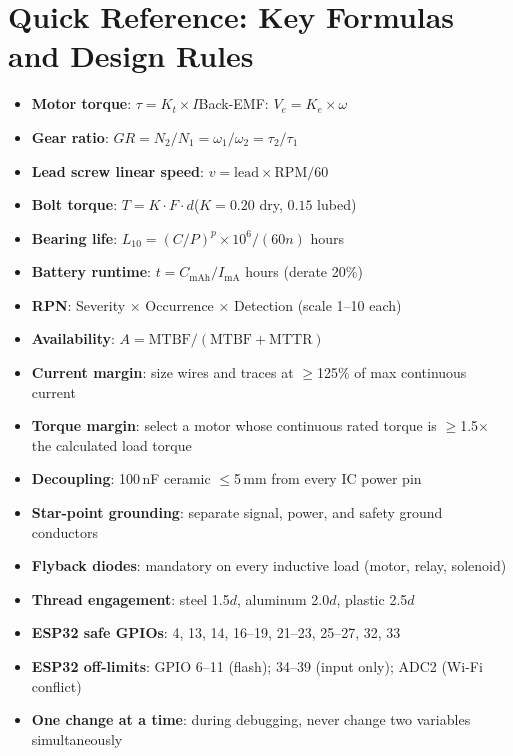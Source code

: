 \section{Quick Reference: Key Formulas and Design Rules}

\begin{checklistbox}
\begin{itemize}[leftmargin=*, itemsep=2pt, topsep=0pt]
    \item \textbf{Motor torque}: $\tau = K_t \times I$\quad Back-EMF: $V_e = K_e \times \omega$
    \item \textbf{Gear ratio}: $GR = N_2/N_1 = \omega_1/\omega_2 = \tau_2/\tau_1$
    \item \textbf{Lead screw linear speed}: $v = \text{lead} \times \text{RPM} / 60$
    \item \textbf{Bolt torque}: $T = K \cdot F \cdot d$\quad ($K=0.20$ dry, $0.15$ lubed)
    \item \textbf{Bearing life}: $L_{10} = (C/P)^p \times 10^6 / (60n)$ hours
    \item \textbf{Battery runtime}: $t = C_{\text{mAh}} / I_{\text{mA}}$ hours (derate 20\%)
    \item \textbf{RPN}: Severity $\times$ Occurrence $\times$ Detection (scale 1--10 each)
    \item \textbf{Availability}: $A = \text{MTBF} / (\text{MTBF} + \text{MTTR})$
\end{itemize}
\end{checklistbox}

\begin{checklistbox}
\begin{itemize}[leftmargin=*, itemsep=2pt, topsep=0pt]
    \item \textbf{Current margin}: size wires and traces at $\geq$125\% of max continuous current
    \item \textbf{Torque margin}: select a motor whose continuous rated torque is $\geq$1.5$\times$ the calculated load torque
    \item \textbf{Decoupling}: 100\,nF ceramic $\leq$5\,mm from every IC power pin
    \item \textbf{Star-point grounding}: separate signal, power, and safety ground conductors
    \item \textbf{Flyback diodes}: mandatory on every inductive load (motor, relay, solenoid)
    \item \textbf{Thread engagement}: steel 1.5$d$, aluminum 2.0$d$, plastic 2.5$d$
    \item \textbf{ESP32 safe GPIOs}: 4, 13, 14, 16--19, 21--23, 25--27, 32, 33
    \item \textbf{ESP32 off-limits}: GPIO 6--11 (flash); 34--39 (input only); ADC2 (Wi-Fi conflict)
    \item \textbf{One change at a time}: during debugging, never change two variables simultaneously
\end{itemize}
\end{checklistbox}

